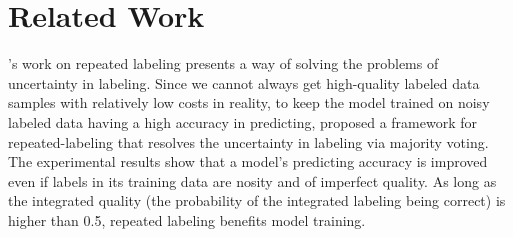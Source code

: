 \documentclass[11pt]{article}
\begin{document}
\section{Related Work}

\cite{sheng2008get}'s work on repeated labeling presents a way of solving the problems of uncertainty in labeling. Since we cannot always get high-quality labeled data samples with relatively low costs in reality, to keep the model trained on noisy labeled data having a high accuracy in predicting,  proposed a framework for repeated-labeling that resolves the uncertainty in labeling via majority voting. The experimental results show that a model's predicting accuracy is improved even if labels in its training data are nosity and of imperfect quality.  As long as the integrated quality (the probability of the integrated labeling being correct) is higher than 0.5, repeated labeling benefits model training. 
\end{document}
